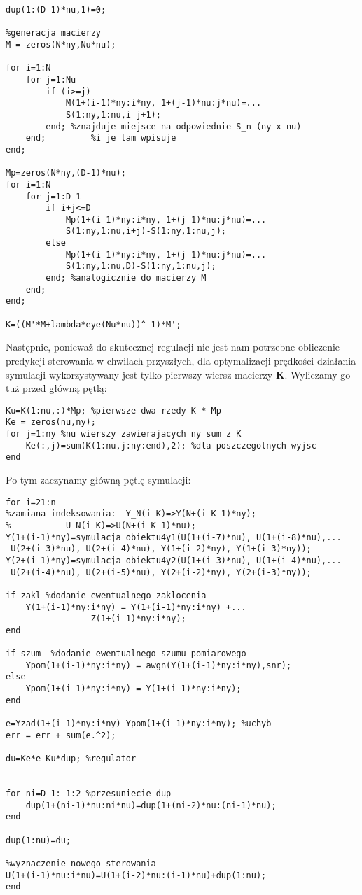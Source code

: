 \begin{lstlisting}[style=Matlab-editor]
%inicjalizacja macierzy dUp
dup(1:(D-1)*nu,1)=0;

%generacja macierzy
M = zeros(N*ny,Nu*nu);

for i=1:N
	for j=1:Nu
		if (i>=j)
			M(1+(i-1)*ny:i*ny, 1+(j-1)*nu:j*nu)=...
			S(1:ny,1:nu,i-j+1);
		end; %znajduje miejsce na odpowiednie S_n (ny x nu) 
	end;	     %i je tam wpisuje
end;

Mp=zeros(N*ny,(D-1)*nu);
for i=1:N
	for j=1:D-1
		if i+j<=D
			Mp(1+(i-1)*ny:i*ny, 1+(j-1)*nu:j*nu)=...
			S(1:ny,1:nu,i+j)-S(1:ny,1:nu,j);
		else
			Mp(1+(i-1)*ny:i*ny, 1+(j-1)*nu:j*nu)=...
			S(1:ny,1:nu,D)-S(1:ny,1:nu,j);
		end; %analogicznie do macierzy M
	end;
end;

K=((M'*M+lambda*eye(Nu*nu))^-1)*M';
\end{lstlisting} 

Następnie, ponieważ do skutecznej regulacji nie jest nam potrzebne obliczenie predykcji sterowania w chwilach przyszłych, dla optymalizacji prędkości działania symulacji wykorzystywany jest tylko pierwszy wiersz macierzy $ \boldsymbol{K} $. Wyliczamy go tuż przed główną pętlą:


\begin{lstlisting}[style=Matlab-editor]
Ku=K(1:nu,:)*Mp; %pierwsze dwa rzedy K * Mp
Ke = zeros(nu,ny);
for j=1:ny %nu wierszy zawierajacych ny sum z K 
	Ke(:,j)=sum(K(1:nu,j:ny:end),2); %dla poszczegolnych wyjsc
end
\end{lstlisting}

Po tym zaczynamy główną pętlę symulacji:
\begin{lstlisting}[style=Matlab-editor]
for i=21:n
%zamiana indeksowania:  Y_N(i-K)=>Y(N+(i-K-1)*ny); 
%			U_N(i-K)=>U(N+(i-K-1)*nu); 
Y(1+(i-1)*ny)=symulacja_obiektu4y1(U(1+(i-7)*nu), U(1+(i-8)*nu),...
 U(2+(i-3)*nu), U(2+(i-4)*nu), Y(1+(i-2)*ny), Y(1+(i-3)*ny));
Y(2+(i-1)*ny)=symulacja_obiektu4y2(U(1+(i-3)*nu), U(1+(i-4)*nu),...
 U(2+(i-4)*nu), U(2+(i-5)*nu), Y(2+(i-2)*ny), Y(2+(i-3)*ny));

if zakl %dodanie ewentualnego zaklocenia
	Y(1+(i-1)*ny:i*ny) = Y(1+(i-1)*ny:i*ny) +...
			     Z(1+(i-1)*ny:i*ny);
end

if szum  %dodanie ewentualnego szumu pomiarowego
	Ypom(1+(i-1)*ny:i*ny) = awgn(Y(1+(i-1)*ny:i*ny),snr);
else
	Ypom(1+(i-1)*ny:i*ny) = Y(1+(i-1)*ny:i*ny);
end

e=Yzad(1+(i-1)*ny:i*ny)-Ypom(1+(i-1)*ny:i*ny); %uchyb
err = err + sum(e.^2);

du=Ke*e-Ku*dup; %regulator


for ni=D-1:-1:2 %przesuniecie dup
	dup(1+(ni-1)*nu:ni*nu)=dup(1+(ni-2)*nu:(ni-1)*nu);
end

dup(1:nu)=du;

%wyznaczenie nowego sterowania
U(1+(i-1)*nu:i*nu)=U(1+(i-2)*nu:(i-1)*nu)+dup(1:nu); 
end

\end{lstlisting}

